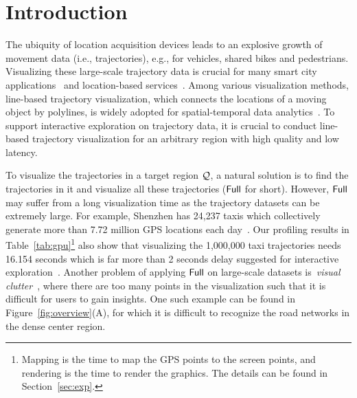 \section{Introduction}\label{sec:intro}
The ubiquity of location acquisition devices leads to an explosive growth of movement data (i.e., trajectories), e.g., for vehicles, shared bikes and pedestrians. Visualizing these large-scale trajectory data is crucial for many smart city applications~\cite{wang2014visual, tang2017efficient, zheng2011learning, zeng2014visualizing} and location-based services~\cite{liu2016smartadp, zheng2010collaborative}. Among various visualization methods, line-based trajectory visualization, which connects the locations of a moving object by polylines, is widely adopted for spatial-temporal data analytics~\cite{chen2015survey, visualanalysis, bigchanvis}. To support interactive exploration on trajectory data, it is crucial to conduct line-based trajectory visualization for an arbitrary region with high quality and low latency.

 To visualize the trajectories in a target region $\mathcal{Q}$, a natural solution is to find the trajectories in it and visualize all these trajectories ($\mathsf{Full}$ for short). However, $\mathsf{Full}$ may suffer from a long visualization time as the trajectory datasets can be extremely large. For example, Shenzhen has 24,237 taxis which collectively generate more than 7.72 million GPS locations each day~\cite{sz}. Our profiling results in Table~\ref{tab:gpu}\footnote{Mapping is the time to map the GPS points to the screen points, and rendering is the time to render the graphics. The details can be found in Section~\ref{sec:exp}.} also show that visualizing the 1,000,000 taxi trajectories needs 16.154 seconds which is far more than 2 seconds delay suggested for interactive exploration~\cite{shneiderman1984response}.
Another problem of applying $\mathsf{Full}$ on large-scale datasets is~\textit{visual clutter}~\cite{kwon2017sampling}, where there are too many points in the visualization such that it is difficult for users to gain insights. One such example can be found in Figure~\ref{fig:overview}(A), for which it is difficult to recognize the road networks in the dense center region.   



